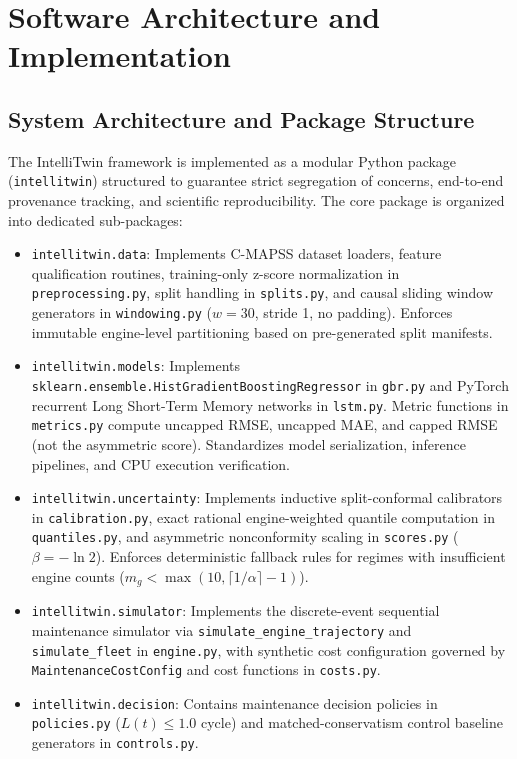 \chapter{Software Architecture and Implementation}
\label{chap:implementation}

\section{System Architecture and Package Structure}
The IntelliTwin framework is implemented as a modular Python package (\texttt{intellitwin}) structured to guarantee strict segregation of concerns, end-to-end provenance tracking, and scientific reproducibility. The core package is organized into dedicated sub-packages:

\begin{itemize}
    \item \texttt{intellitwin.data}: Implements C-MAPSS dataset loaders, feature qualification routines, training-only z-score normalization in \texttt{preprocessing.py}, split handling in \texttt{splits.py}, and causal sliding window generators in \texttt{windowing.py} ($w=30$, stride 1, no padding). Enforces immutable engine-level partitioning based on pre-generated split manifests.
    \item \texttt{intellitwin.models}: Implements \texttt{sklearn.ensemble.HistGradientBoostingRegressor} in \texttt{gbr.py} and PyTorch recurrent Long Short-Term Memory networks in \texttt{lstm.py}. Metric functions in \texttt{metrics.py} compute uncapped RMSE, uncapped MAE, and capped RMSE (not the asymmetric score). Standardizes model serialization, inference pipelines, and CPU execution verification.
    \item \texttt{intellitwin.uncertainty}: Implements inductive split-conformal calibrators in \texttt{calibration.py}, exact rational engine-weighted quantile computation in \texttt{quantiles.py}, and asymmetric nonconformity scaling in \texttt{scores.py} ($\beta = -\ln 2$). Enforces deterministic fallback rules for regimes with insufficient engine counts ($m_g < \max(10, \lceil 1/\alpha \rceil - 1)$).
    \item \texttt{intellitwin.simulator}: Implements the discrete-event sequential maintenance simulator via \texttt{simulate\_engine\_trajectory} and \texttt{simulate\_fleet} in \texttt{engine.py}, with synthetic cost configuration governed by \texttt{MaintenanceCostConfig} and cost functions in \texttt{costs.py}.
    \item \texttt{intellitwin.decision}: Contains maintenance decision policies in \texttt{policies.py} ($L(t) \le 1.0$ cycle) and matched-conservatism control baseline generators in \texttt{controls.py}.

\end{itemize}
